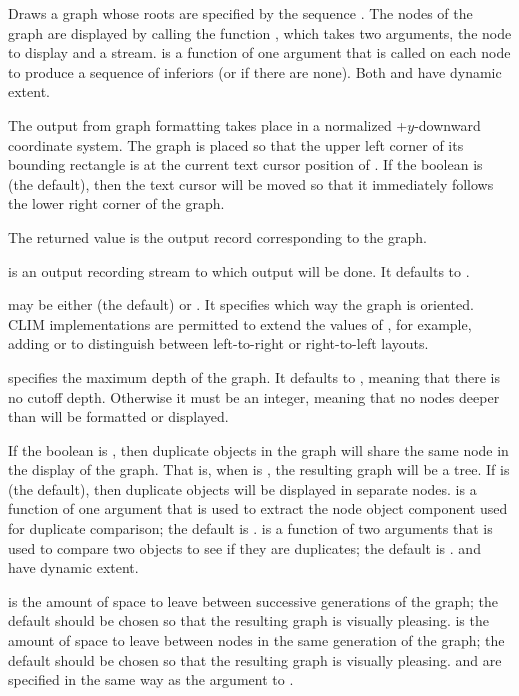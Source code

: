 Draws a graph whose roots are specified by the sequence .  The
nodes of the graph are displayed by calling the function ,
which takes two arguments, the node to display and a stream.
 is a function of one argument that is called on each
node to produce a sequence of inferiors (or  if there are none).  Both
 and  have dynamic extent.

The output from graph formatting takes place in a normalized +$y$-downward
coordinate system.  The graph is placed so that the upper left corner of its
bounding rectangle is at the current text cursor position of .  If
the boolean  is  (the default), then the text cursor
will be moved so that it immediately follows the lower right corner of the
graph.

The returned value is the output record corresponding to the graph.

 is an output recording stream to which output will be done.  It
defaults to .

 may be either  (the default) or
.  It specifies which way the graph is oriented.  CLIM
implementations are permitted to extend the values of , for
example, adding  or  to distinguish between left-to-right
or right-to-left layouts.

 specifies the maximum depth of the graph.  It defaults to
, meaning that there is no cutoff depth.  Otherwise it must be an
integer, meaning that no nodes deeper than  will be formatted
or displayed.

If the boolean  is , then duplicate objects in
the graph will share the same node in the display of the graph.  That is, when
 is , the resulting graph will be a tree.  If
 is  (the default), then duplicate objects
will be displayed in separate nodes.   is a function of one
argument that is used to extract the node object component used for duplicate
comparison; the default is .   is a function of
two arguments that is used to compare two objects to see if they are duplicates;
the default is .   and  have
dynamic extent.

 is the amount of space to leave between successive
generations of the graph; the default should be chosen so that the resulting
graph is visually pleasing.   is the amount of
space to leave between nodes in the same generation of the graph; the default
should be chosen so that the resulting graph is visually pleasing.
 and  are specified
in the same way as the  argument to
.

